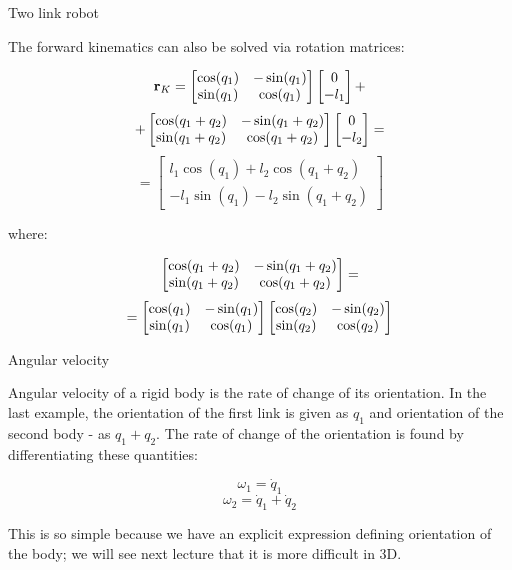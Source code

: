 \documentclass{beamer}
\begin{document}
\begin{frame}{Two link robot}
	\begin{flushleft}
		
		The forward kinematics can also be solved via rotation matrices:
		
		$$
			\mathbf{r}_K = 
			\begin{bmatrix} \cos(q_1) & -\sin (q_1) \\ \sin (q_1) & \cos(q_1) \end{bmatrix}
			\begin{bmatrix}
				0 \\ 
				-l_1 
			\end{bmatrix}
		+$$
		$$+
		\begin{bmatrix} \cos(q_1+q_2) & -\sin (q_1+q_2) \\ \sin (q_1+q_2) & \cos(q_1+q_2) \end{bmatrix}
		\begin{bmatrix}
			0 \\ 
			-l_2 
		\end{bmatrix}
			=$$
			$$
			=
			\begin{bmatrix}
				l_1 \cos (q_1) + l_2  \cos (q_1+q_2) \\ 
				- l_1 \sin (q_1)  - l_2 \sin (q_1+q_2) 
			\end{bmatrix}
		$$
		
		where:
		
		$$ \begin{bmatrix} \cos(q_1+q_2) & -\sin (q_1+q_2) \\ \sin (q_1+q_2) & \cos(q_1+q_2) \end{bmatrix}  =$$
		$$=
		\begin{bmatrix} \cos(q_1) & -\sin (q_1) \\ \sin (q_1) & \cos(q_1) \end{bmatrix}
		\begin{bmatrix} \cos(q_2) & -\sin (q_2) \\ \sin (q_2) & \cos(q_2) \end{bmatrix}
		$$ 
		
		
		
		
		
	\end{flushleft}
\end{frame}



\begin{frame}{Angular velocity}
	\begin{flushleft}
		
		Angular velocity of a rigid body is the rate of change of its orientation. In the last example, the orientation of the first link is given as $q_1$ and orientation of the second body - as $q_1 + q_2$. The rate of change of the orientation is found by differentiating these quantities:
		
		\begin{equation}
			\omega_1 = \dot q_1
		\end{equation}
		\begin{equation}
			\omega_2 = \dot q_1 + \dot q_2  
		\end{equation}
		
		This is so simple because we have an explicit expression defining orientation of the body; we will see next lecture that it is more difficult in 3D.
		
	\end{flushleft}
\end{frame}
\end{document}
